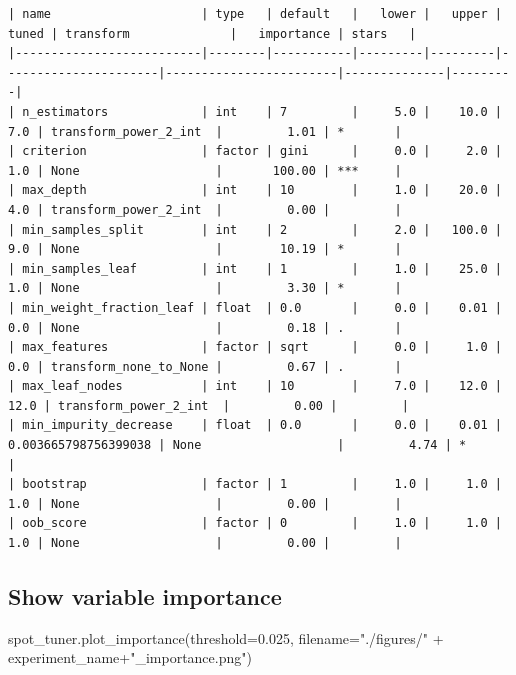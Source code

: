 \documentclass[
  letterpaper,
  DIV=11,
  numbers=noendperiod]{scrreprt}
\newenvironment{Shaded}{\begin{snugshade}}{\end{snugshade}}
\newcommand{\FloatTok}[1]{\textcolor[rgb]{0.68,0.00,0.00}{#1}}
\newcommand{\NormalTok}[1]{\textcolor[rgb]{0.00,0.23,0.31}{#1}}
\newcommand{\OperatorTok}[1]{\textcolor[rgb]{0.37,0.37,0.37}{#1}}
\newcommand{\StringTok}[1]{\textcolor[rgb]{0.13,0.47,0.30}{#1}}
\begin{document}
\begin{verbatim}
| name                     | type   | default   |   lower |   upper |                tuned | transform              |   importance | stars   |
|--------------------------|--------|-----------|---------|---------|----------------------|------------------------|--------------|---------|
| n_estimators             | int    | 7         |     5.0 |    10.0 |                  7.0 | transform_power_2_int  |         1.01 | *       |
| criterion                | factor | gini      |     0.0 |     2.0 |                  1.0 | None                   |       100.00 | ***     |
| max_depth                | int    | 10        |     1.0 |    20.0 |                  4.0 | transform_power_2_int  |         0.00 |         |
| min_samples_split        | int    | 2         |     2.0 |   100.0 |                  9.0 | None                   |        10.19 | *       |
| min_samples_leaf         | int    | 1         |     1.0 |    25.0 |                  1.0 | None                   |         3.30 | *       |
| min_weight_fraction_leaf | float  | 0.0       |     0.0 |    0.01 |                  0.0 | None                   |         0.18 | .       |
| max_features             | factor | sqrt      |     0.0 |     1.0 |                  0.0 | transform_none_to_None |         0.67 | .       |
| max_leaf_nodes           | int    | 10        |     7.0 |    12.0 |                 12.0 | transform_power_2_int  |         0.00 |         |
| min_impurity_decrease    | float  | 0.0       |     0.0 |    0.01 | 0.003665798756399038 | None                   |         4.74 | *       |
| bootstrap                | factor | 1         |     1.0 |     1.0 |                  1.0 | None                   |         0.00 |         |
| oob_score                | factor | 0         |     1.0 |     1.0 |                  1.0 | None                   |         0.00 |         |
\end{verbatim}

\hypertarget{show-variable-importance-1}{%
\subsection{Show variable importance}\label{show-variable-importance-1}}

\begin{Shaded}
\begin{Highlighting}[]
\NormalTok{spot\_tuner.plot\_importance(threshold}\OperatorTok{=}\FloatTok{0.025}\NormalTok{, filename}\OperatorTok{=}\StringTok{"./figures/"} \OperatorTok{+}\NormalTok{ experiment\_name}\OperatorTok{+}\StringTok{"\_importance.png"}\NormalTok{)}
\end{Highlighting}
\end{Shaded}
\end{document}
